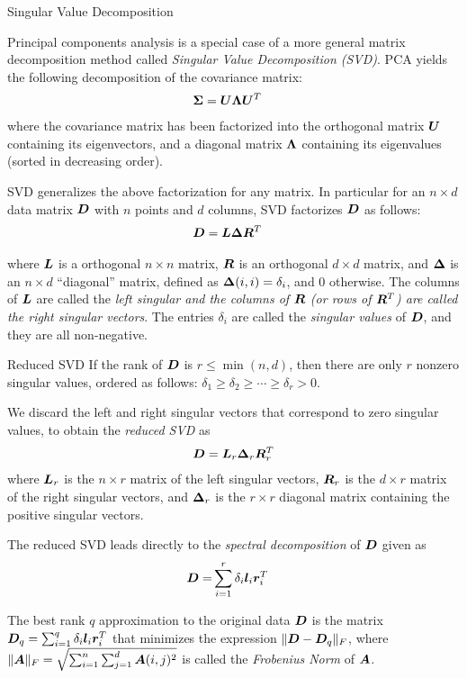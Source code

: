 \begin{frame}{Singular Value Decomposition}
  \small

  Principal components analysis is a special case of a more general
matrix decomposition method called {\em Singular Value
Decomposition (SVD)}.  
PCA yields the following decomposition of the covariance
matrix:
\begin{align*}
   {\bm \Sigma} & = {\boldsymbol U} {\bm \Lambda} {\boldsymbol U}^T
\end{align*}
where the covariance matrix has been factorized into
the orthogonal matrix ${\boldsymbol U}$ containing its eigenvectors, and a
diagonal matrix ${\bm \Lambda}$ containing its eigenvalues (sorted in
decreasing order).

\medskip
SVD generalizes the above factorization for any matrix. In particular
for an $n \times d$ data matrix ${\boldsymbol D}$ with $n$ points and $d$ columns, SVD factorizes ${\boldsymbol D}$ as follows:
\begin{align*}
  {\boldsymbol D} &= {\boldsymbol L} {\bm \Delta} {\boldsymbol R}^T
\end{align*}

where ${\boldsymbol L}$ is a orthogonal $n \times n$ matrix,
${\boldsymbol R}$ is an
orthogonal $d \times d$ matrix, and ${\bm \Delta}$ is an 
$n \times d$ ``diagonal'' matrix, 
defined as ${\bm \Delta}(i,i) = \delta_i$, and $0$
otherwise.
The columns of ${\boldsymbol L}$ are called the {\em left singular
  and the columns of ${\boldsymbol R}$ (or rows of ${\boldsymbol R}^T$) are called the
\em right singular vectors}.
The entries $\delta_{i}$ are called the 
{\em singular values} of ${\boldsymbol D}$, and they are all non-negative.
\end{frame}

\begin{frame}{Reduced SVD}
  \small
If the rank of ${\boldsymbol D}$ is $r \le \min(n,d)$, then
there are only $r$ nonzero
singular values, ordered as follows:
$\delta_1 \ge
\delta_2 \ge \cdots \ge \delta_r > 0$.

\medskip
We
discard the left and right singular vectors that correspond to zero
singular values, to obtain the {\em reduced SVD} as
\begin{align*}
{\boldsymbol D} = {\boldsymbol L}_r {\bm \Delta}_r {\boldsymbol R}_r^T
\end{align*}
where ${\boldsymbol L}_r$ is the $n \times r$ matrix of the left
singular vectors,
${\boldsymbol R}_r$ is the $d \times r$ matrix of the right
singular vectors, and ${\bm \Delta}_r$ is the $r \times r$ diagonal
matrix containing the positive singular vectors.

\medskip
The reduced SVD leads directly to
the {\em spectral decomposition} of
${\boldsymbol D}$ given as
\begin{align*}
{\boldsymbol D}   = & \sum_{i=1}^r \delta_i \boldsymbol l_i {\boldsymbol r}^T_i
\end{align*}

The best rank $q$ approximation to the
original data ${\boldsymbol D}$ is the matrix
${\boldsymbol D}_q = \sum_{i=1}^q \delta_i \boldsymbol l_i {\boldsymbol r}^T_i$
that
minimizes the expression $\|{\boldsymbol D} - {\boldsymbol D}_q\|_F$,
where $\|{\boldsymbol A}\|_F = \sqrt{\sum_{i=1}^n \sum_{j=1}^d {\boldsymbol A}(i,j)^2}$
is called the {\em Frobenius Norm} of ${\boldsymbol A}$.
\end{frame}



